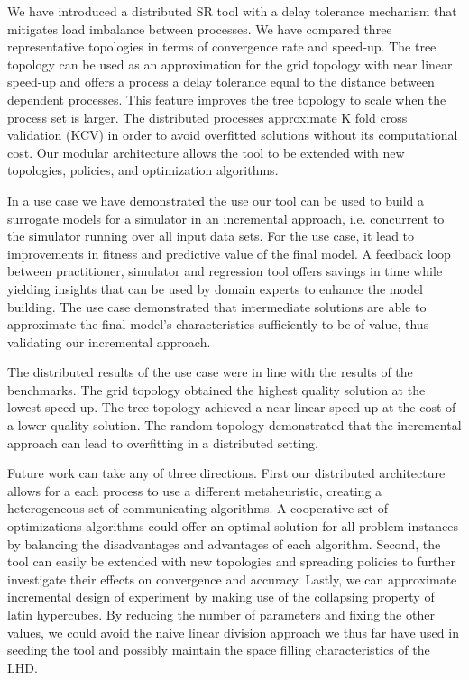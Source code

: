 We have introduced a distributed SR tool with a delay tolerance mechanism that mitigates load imbalance between processes. We have compared three representative topologies in terms of convergence rate and speed-up. The tree topology can be used as an approximation for the grid topology with near linear speed-up and offers a process a delay tolerance equal to the distance between dependent processes. This feature improves the tree topology to scale when the process set is larger. The distributed processes approximate K fold cross validation (KCV) in order to avoid overfitted solutions without its computational cost. Our modular architecture allows the tool to be extended with new topologies, policies, and optimization algorithms. 

In a use case we have demonstrated the use our tool can be used to build a surrogate models for a simulator in an incremental approach, i.e. concurrent to the simulator running over all input data sets. For the use case, it lead to improvements in fitness and predictive value of the final model. A feedback loop between practitioner, simulator and regression tool offers savings in time while yielding insights that can be used by domain experts to enhance the model building. The use case demonstrated that intermediate solutions are able to approximate the final model's characteristics sufficiently to be of value, thus validating our incremental approach. 

The distributed results of the use case were in line with the results of the benchmarks. The grid topology obtained the highest quality solution at the lowest speed-up. The tree topology achieved a near linear speed-up at the cost of a lower quality solution. The random topology demonstrated that the incremental approach can lead to overfitting in a distributed setting. 

Future work can take any of three directions. First our distributed architecture allows for a each process to use a different metaheuristic, creating a heterogeneous set of communicating algorithms. A cooperative set of optimizations algorithms could offer an optimal solution for all problem instances by balancing the disadvantages and advantages of each algorithm. 
Second, the tool can easily be extended with new topologies and spreading policies to further investigate their effects on convergence and accuracy. Lastly, we can approximate incremental design of experiment by making use of the collapsing property of latin hypercubes. By reducing the number of parameters and fixing the other values, we could avoid the naive linear division approach we thus far have used in seeding the tool and possibly maintain the space filling characteristics of the LHD.
